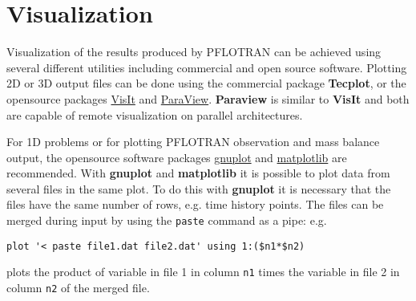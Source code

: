 
\section{Visualization}

Visualization of the results produced by PFLOTRAN can be achieved using several different utilities including commercial and open source software. 
Plotting 2D or 3D output files can be done using the commercial package {\bf Tecplot}, or the opensource packages \href{https://wci.llnl.gov/codes/visit/}{VisIt} and \href{http://www.paraview.org/}{ParaView}. {\bf Paraview} is similar to {\bf VisIt} and both are capable of remote visualization on parallel architectures. 

For 1D problems or for plotting PFLOTRAN observation and mass balance output, the opensource software packages \href{http://www.gnuplot.info/}{gnuplot} and \href{http://matplotlib.org/}{matplotlib} are recommended.
With {\bf gnuplot} and {\bf matplotlib} it is possible to plot data from several files in the same plot.
To do this with {\bf gnuplot} it is necessary that the files have the same number of rows, e.g. time history points. The files can be merged during input by using the {\tt paste} command as a pipe: e.g.

\verb|plot '< paste file1.dat file2.dat' using 1:($n1*$n2)|

\noindent
plots the product of variable in file 1 in column {\tt n1} times the variable in file 2 in column {\tt n2} of the merged file.
